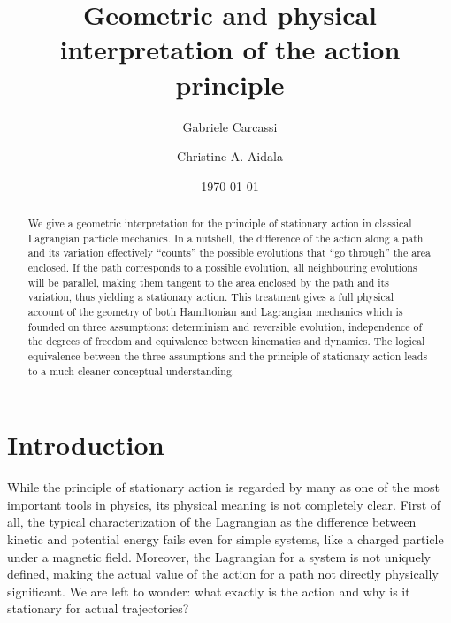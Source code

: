 \documentclass[fleqn,10pt]{wlscirep}
\begin{document}
\linenumbers

\title{Geometric and physical interpretation of the action principle}
\author[1]{Gabriele Carcassi}
\author[1,*]{Christine A. Aidala}




\date{\today}


\begin{abstract}
We give a geometric interpretation for the principle of stationary action in classical Lagrangian particle mechanics. In a nutshell, the difference of the action along a path and its variation effectively ``counts'' the possible evolutions that ``go through'' the area enclosed. If the path corresponds to a possible evolution, all neighbouring evolutions will be parallel, making them tangent to the area enclosed by the path and its variation, thus yielding a stationary action. This treatment gives a full physical account of the geometry of both Hamiltonian and Lagrangian mechanics which is founded on three assumptions: determinism and reversible evolution, independence of the degrees of freedom and equivalence between kinematics and dynamics. The logical equivalence between the three assumptions and the principle of stationary action leads to a much cleaner conceptual understanding.
\end{abstract}

\maketitle

\section*{Introduction}

While the principle of stationary action is regarded by many as one of the most important tools in physics,\cite{hamilton1834general, heaviside1903, feynman1942principle, brenier1989least, rojo2018principle} its physical meaning is not completely clear. First of all, the typical characterization of the Lagrangian as the difference between kinetic and potential energy fails even for simple systems, like a charged particle under a magnetic field. Moreover, the Lagrangian for a system is not uniquely defined, making the actual value of the action for a path not directly physically significant.  We are left to wonder: what exactly is the action and why is it stationary for actual trajectories?
\end{document}

